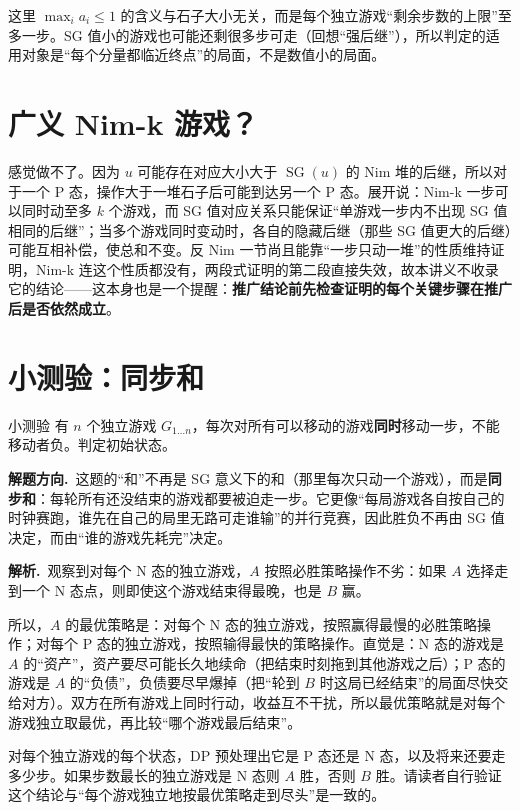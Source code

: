 \documentclass[UTF8,a4paper,11pt,oneside,openany,fontset=fandol]{ctexbook}
\theoremstyle{definition}
\newcommand{\SG}{\operatorname{SG}}
\newcommand{\sol}{\par\noindent\textbf{解析.}\ }
\newcommand{\hint}{\par\noindent\textbf{解题方向.}\ }
\begin{document}
\begin{pitfall}
这里 $\max_i a_i\le1$ 的含义与石子大小无关，而是每个独立游戏“剩余步数的上限”至多一步。SG 值小的游戏也可能还剩很多步可走（回想“强后继”），所以判定的适用对象是“每个分量都临近终点”的局面，不是数值小的局面。
\end{pitfall}

\section{广义 Nim-k 游戏？}
感觉做不了。因为 $u$ 可能存在对应大小大于 $\SG(u)$ 的 Nim 堆的后继，所以对于一个 P 态，操作大于一堆石子后可能到达另一个 P 态。展开说：Nim-k 一步可以同时动至多 $k$ 个游戏，而 SG 值对应关系只能保证“单游戏一步内不出现 SG 值相同的后继”；当多个游戏同时变动时，各自的隐藏后继（那些 SG 值更大的后继）可能互相补偿，使总和不变。反 Nim 一节尚且能靠“一步只动一堆”的性质维持证明，Nim-k 连这个性质都没有，两段式证明的第二段直接失效，故本讲义不收录它的结论——这本身也是一个提醒：\textbf{推广结论前先检查证明的每个关键步骤在推广后是否依然成立}。

\section{小测验：同步和}
\begin{problem}{小测验}
有 $n$ 个独立游戏 $G_{1\ldots n}$，每次对所有可以移动的游戏\textbf{同时}移动一步，不能移动者负。判定初始状态。
\end{problem}

\hint 这题的“和”不再是 SG 意义下的和（那里每次只动一个游戏），而是\textbf{同步和}：每轮所有还没结束的游戏都要被迫走一步。它更像“每局游戏各自按自己的时钟赛跑，谁先在自己的局里无路可走谁输”的并行竞赛，因此胜负不再由 SG 值决定，而由“谁的游戏先耗完”决定。

\sol 观察到对每个 N 态的独立游戏，$A$ 按照必胜策略操作不劣：如果 $A$ 选择走到一个 N 态点，则即使这个游戏结束得最晚，也是 $B$ 赢。

所以，$A$ 的最优策略是：对每个 N 态的独立游戏，按照赢得最慢的必胜策略操作；对每个 P 态的独立游戏，按照输得最快的策略操作。直觉是：N 态的游戏是 $A$ 的“资产”，资产要尽可能长久地续命（把结束时刻拖到其他游戏之后）；P 态的游戏是 $A$ 的“负债”，负债要尽早爆掉（把“轮到 $B$ 时这局已经结束”的局面尽快交给对方）。双方在所有游戏上同时行动，收益互不干扰，所以最优策略就是对每个游戏独立取最优，再比较“哪个游戏最后结束”。

对每个独立游戏的每个状态，DP 预处理出它是 P 态还是 N 态，以及将来还要走多少步。如果步数最长的独立游戏是 N 态则 $A$ 胜，否则 $B$ 胜。请读者自行验证这个结论与“每个游戏独立地按最优策略走到尽头”是一致的。
\end{document}
